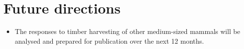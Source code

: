 \documentclass[version=last,
    paper=a4, %
    10pt, %
    usenames,
    dvipsnames,
    oneside, %
    headings=openany, %
    DIV=15 %
]{scrbook}
\begin{document}
\section*{Future directions}
\begin{itemize}
\itemsep1pt\parskip0pt
\item
  The responses to timber harvesting of other medium-sized mammals will
  be analysed and prepared for publication over the next 12 months.
\end{itemize}



\end{document}
